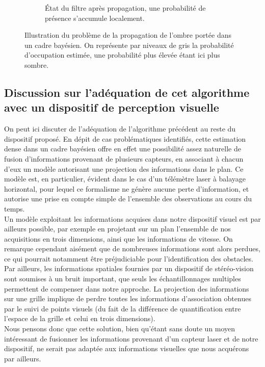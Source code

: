 \begin{figure}[h]
\begin{center}
{\begin{subfigure}{0.43\textwidth}
			\caption{État du filtre après propagation, une probabilité de présence s'accumule localement.}
		\end{subfigure}	
		}
	\caption{Illustration du problème de la propagation de l'ombre portée dans un cadre bayésien. On représente par niveaux de gris la probabilité d'occupation estimée, une probabilité plus élevée étant ici plus sombre.}
	\label{fig:ch5_bayesian_shadow}
	\end{center}
\end{figure}

\subsection{Discussion sur l'adéquation de cet algorithme avec un dispositif de perception visuelle} \label{sec:ch5_Discussion_adéquation_bayésien2D}
On peut ici discuter de l'adéquation de l'algorithme précédent au reste du dispositif proposé. En dépit de cas problématiques identifiés, cette estimation dense dans un cadre bayésien offre en effet une possibilité assez naturelle de fusion d'informations provenant de plusieurs capteurs, en associant à chacun d'eux un modèle autorisant une projection des informations dans le plan. Ce modèle est, en particulier, évident dans le cas d'un télémètre laser à balayage horizontal, pour lequel ce formalisme ne génère aucune perte d'information, et autorise une prise en compte simple de l'ensemble des observations au cours du temps. \\

Un modèle exploitant les informations acquises dans notre dispositif visuel est par ailleurs possible, par exemple en projetant sur un plan l'ensemble de nos acquisitions en trois dimensions, ainsi que les informations de vitesse. On remarque cependant aisément que de nombreuses informations sont alors perdues, ce qui pourrait notamment être préjudiciable pour l'identification des obstacles. Par ailleurs, les informations spatiales fournies par un dispositif de stéréo-vision sont soumises à un bruit important, que seuls les échantillonnages multiples permettent de compenser dans notre approche. La projection des informations sur une grille implique de perdre toutes les informations d'association obtenues par le suivi de points visuels (du fait de la différence de quantification entre l'espace de la grille et celui en trois dimensions).\\

Nous pensons donc que cette solution, bien qu'étant sans doute un moyen intéressant de fusionner les informations provenant d'un capteur laser et de notre dispositif, ne serait pas adaptée aux informations visuelles que nous acquérons par ailleurs.

